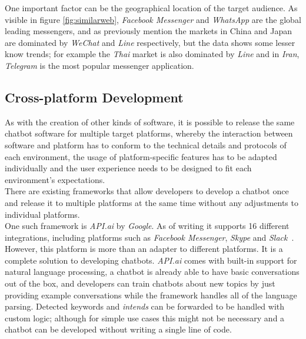 \label{geography}

One important factor can be the geographical location of the target audience.
As visible in figure \ref{fig:similarweb}, \emph{Facebook Messenger} and \emph{WhatsApp} are the global leading messengers,
and as previously mention the markets in China and Japan are dominated by \emph{WeChat} and \emph{Line} respectively,
but the data shows some lesser know trends; for example the \emph{Thai} market is also dominated by \emph{Line}
and in \emph{Iran}, \emph{Telegram} is the most popular messenger application.


\subsection{Cross-platform Development}
\label{crossplatform}

As with the creation of other kinds of software, it is possible to release the same chatbot software for multiple target platforms,
whereby the interaction between software and platform has to conform to the technical details and protocols of each environment, the usage of platform-specific features has to be adapted individually and the user experience needs to be designed to fit each environment's expectations.
\\

There are existing frameworks that allow developers to develop a chatbot once and release it to multiple platforms at the same time without any adjustments to individual platforms.
\\
One such framework is \emph{API.ai} by \emph{Google}.
As of writing it supports 16 different integrations, including platforms such as \emph{Facebook Messenger}, \emph{Skype} and \emph{Slack}~\cite{apiai}.
However, this platform is more than an adapter to different platforms.
It is a complete solution to developing chatbots.
\emph{API.ai} comes with built-in support for natural language processing,
a chatbot is already able to have basic conversations out of the box,
and developers can train chatbots about new topics by just providing example conversations while the framework handles all of the language parsing.
Detected keywords and \emph{intends} can be forwarded to be handled with custom logic;
although for simple use cases this might not be necessary and a chatbot can be developed without writing a single line of code.
\\

